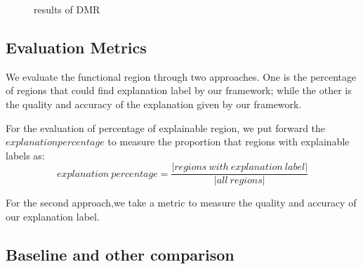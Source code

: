 \documentclass[runningheads]{llncs}
\begin{document}
\begin{figure}[h]
\centering
{}
\caption{results of DMR}
\label{The results of functional region identification}
\end{figure}

\subsection{Evaluation Metrics}
We evaluate the functional region through two approaches. One is the percentage of regions that could find explanation label by our framework; while the other is the quality and accuracy of the explanation given by our framework.

For the evaluation of percentage of explainable region, we put forward the $explanation percentage$ to measure the proportion that regions with explainable labels as:
$$explanation\ percentage=\frac{|regions\ with\ explanation\ label|}{|all\ regions|}$$

For the second approach,we take a metric to measure the quality and accuracy of our explanation label.

\subsection{Baseline and other comparison}
\end{document}
